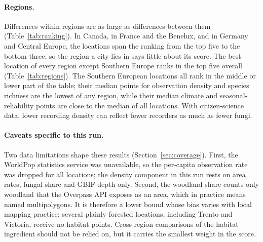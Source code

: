 \paragraph{Regions.} Differences within regions are as large as differences between them
(Table~\ref{tab:ranking}). In Canada, in France and the Benelux, and in Germany and Central Europe, the
locations span the ranking from the top five to the bottom three, so the region a city lies in says little
about its score. The best location of every region except Southern Europe ranks in the top five overall
(Table~\ref{tab:regions}). The Southern European locations all rank in the middle or lower part of the table;
their median points for observation density and species richness are the lowest of any region, while their
median climate and seasonal-reliability points are close to the median of all locations. With citizen-science data,
lower recording density can reflect fewer recorders as much as fewer fungi.

\paragraph{Caveats specific to this run.} Two data limitations shape these results (Section~\ref{sec:coverage}).
First, the WorldPop statistics service was unavailable, so the per-capita observation rate was dropped for all
locations; the density component in this run rests on area rates, fungal share and GBIF depth only. Second, the
woodland share counts only woodland that the Overpass API exposes as an area, which in practice means named
multipolygons. It is therefore a lower bound whose bias varies with local mapping practice: several plainly
forested locations, including Trento and Victoria, receive no habitat points. Cross-region comparisons of the
habitat ingredient should not be relied on, but it carries the smallest weight in the score.

